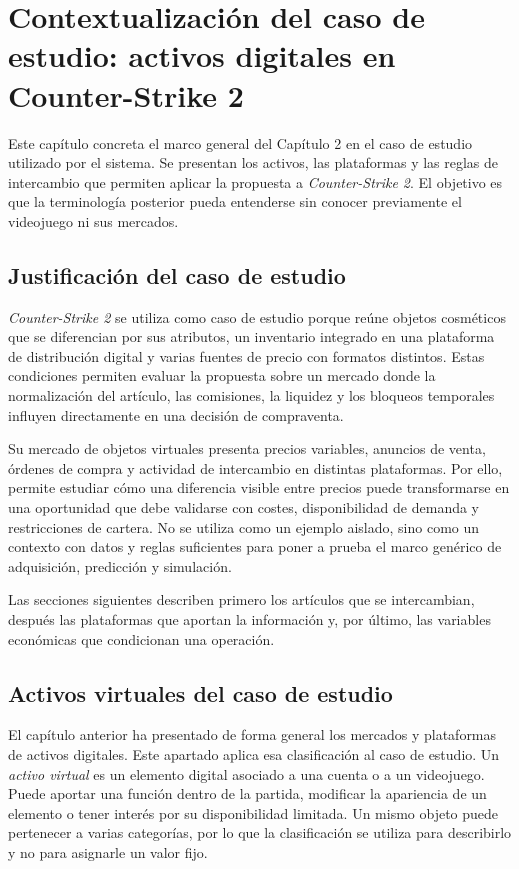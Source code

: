 \chapter{Contextualización del caso de estudio: activos digitales en Counter-Strike 2}

\noindent Este capítulo concreta el marco general del Capítulo 2 en el caso de estudio utilizado por el sistema. Se presentan los activos, las plataformas y las reglas de intercambio que permiten aplicar la propuesta a \textit{Counter-Strike 2}. El objetivo es que la terminología posterior pueda entenderse sin conocer previamente el videojuego ni sus mercados.

\section{Justificación del caso de estudio}

\textit{Counter-Strike 2} se utiliza como caso de estudio porque reúne objetos cosméticos que se diferencian por sus atributos, un inventario integrado en una plataforma de distribución digital y varias fuentes de precio con formatos distintos. Estas condiciones permiten evaluar la propuesta sobre un mercado donde la normalización del artículo, las comisiones, la liquidez y los bloqueos temporales influyen directamente en una decisión de compraventa.

Su mercado de objetos virtuales presenta precios variables, anuncios de venta, órdenes de compra y actividad de intercambio en distintas plataformas. Por ello, permite estudiar cómo una diferencia visible entre precios puede transformarse en una oportunidad que debe validarse con costes, disponibilidad de demanda y restricciones de cartera. No se utiliza como un ejemplo aislado, sino como un contexto con datos y reglas suficientes para poner a prueba el marco genérico de adquisición, predicción y simulación.

Las secciones siguientes describen primero los artículos que se intercambian, después las plataformas que aportan la información y, por último, las variables económicas que condicionan una operación.

\section{Activos virtuales del caso de estudio}

El capítulo anterior ha presentado de forma general los mercados y plataformas de activos digitales. Este apartado aplica esa clasificación al caso de estudio. Un \emph{activo virtual} es un elemento digital asociado a una cuenta o a un videojuego. Puede aportar una función dentro de la partida, modificar la apariencia de un elemento o tener interés por su disponibilidad limitada. Un mismo objeto puede pertenecer a varias categorías, por lo que la clasificación se utiliza para describirlo y no para asignarle un valor fijo.

